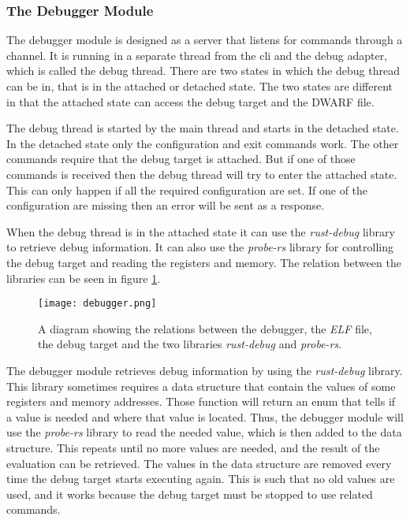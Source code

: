 \subsubsection{The Debugger Module}
The debugger module is designed as a server that listens for commands through a channel.
It is running in a separate thread from the \acrshort{cli} and the debug adapter, which is called the debug thread.
There are two states in which the debug thread can be in, that is in the attached or detached state.
The two states are different in that the attached state can access the debug target and the \gls{DWARF} file.


The debug thread is started by the main thread and starts in the detached state.
In the detached state only the configuration and exit commands work.
The other commands require that the debug target is attached.
But if one of those commands is received then the debug thread will try to enter the attached state.
This can only happen if all the required configuration are set.
If one of the configuration are missing then an error will be sent as a response.


When the debug thread is in the attached state it can use the \emph{rust-debug} library to retrieve debug information.
It can also use the \emph{probe-rs} library for controlling the debug target and reading the registers and memory.
The relation between the libraries can be seen in figure \ref{fig:debugger}.


\begin{figure}[h]
	\centering
	\texttt{[image: debugger.png]}
	\caption{A diagram showing the relations between the debugger, the \emph{ELF} file, the debug target and the two libraries \emph{rust-debug} and \emph{probe-rs}.}
	\label{fig:debugger}
\end{figure}


The debugger module retrieves debug information by using the \emph{rust-debug} library.
This library sometimes requires a data structure that contain the values of some registers and memory addresses.
Those function will return an enum that tells if a value is needed and where that value is located.
Thus, the debugger module will use the \emph{probe-rs} library to read the needed value, which is then added to the data structure.
This repeats until no more values are needed, and the result of the evaluation can be retrieved.
The values in the data structure are removed every time the debug target starts executing again.
This is such that no old values are used, and it works because the debug target must be stopped to use related commands.



